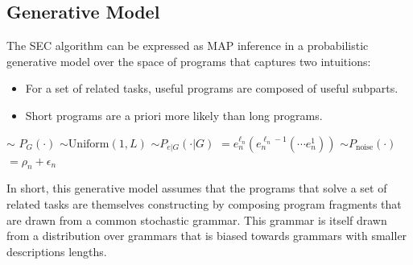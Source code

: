 \documentclass{article} %
\begin{document}
\subsection{Generative Model}
The SEC algorithm can be expressed as MAP inference in a probabilistic generative model over the space of programs that captures two intuitions:
\begin{itemize}
\item{For a set of related tasks, useful programs are composed of useful subparts.}
\item{Short programs are a priori more likely than long programs.}
\end{itemize}
\begin{codebox}
\li {} $\sim$ $P_G(\cdot)$ 
\li {} $\sim\mbox{Uniform}(1, L)$ 
\li {}
\li {} $\sim P_{e|G}(\cdot | G)$
\li {} $= e_n^{\ell_n} (e_n^{\ell_n-1} ( \cdots e_n^{1}))$
\li {}
\li {} $\sim P_{\mbox{noise}}(\cdot)$
\li {} $= \rho_n + \epsilon_n$
\end{codebox}

In short, this generative model assumes that the programs that solve a set of related tasks are themselves constructing by composing program fragments that are drawn from a common stochastic grammar. This grammar is itself drawn from a distribution over grammars that is biased towards grammars with smaller descriptions lengths. 
\end{document}
